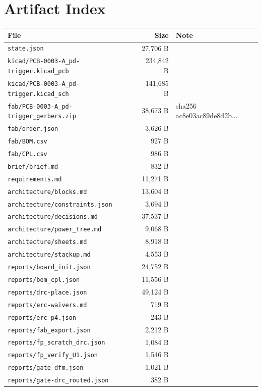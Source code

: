 \documentclass[11pt,a4paper]{article}
\begin{document}
\section{Artifact Index}
{\small
\begin{longtable}{p{9cm}rp{4cm}}
\toprule
\textbf{File} & \textbf{Size} & \textbf{Note} \\
\midrule
\endhead
\texttt{state.json} & 27,706 B &  \\
\texttt{kicad/PCB-0003-A\_pd-trigger.kicad\_pcb} & 234,842 B &  \\
\texttt{kicad/PCB-0003-A\_pd-trigger.kicad\_sch} & 141,685 B &  \\
\texttt{fab/PCB-0003-A\_pd-trigger\_gerbers.zip} & 38,673 B & sha256 ac8e03ac89de8d2b... \\
\texttt{fab/order.json} & 3,626 B &  \\
\texttt{fab/BOM.csv} & 927 B &  \\
\texttt{fab/CPL.csv} & 986 B &  \\
\texttt{brief/brief.md} & 832 B &  \\
\texttt{requirements.md} & 11,271 B &  \\
\texttt{architecture/blocks.md} & 13,604 B &  \\
\texttt{architecture/constraints.json} & 3,694 B &  \\
\texttt{architecture/decisions.md} & 37,537 B &  \\
\texttt{architecture/power\_tree.md} & 9,068 B &  \\
\texttt{architecture/sheets.md} & 8,918 B &  \\
\texttt{architecture/stackup.md} & 4,553 B &  \\
\texttt{reports/board\_init.json} & 24,752 B &  \\
\texttt{reports/bom\_cpl.json} & 11,556 B &  \\
\texttt{reports/drc-place.json} & 49,124 B &  \\
\texttt{reports/erc-waivers.md} & 719 B &  \\
\texttt{reports/erc\_p4.json} & 243 B &  \\
\texttt{reports/fab\_export.json} & 2,212 B &  \\
\texttt{reports/fp\_scratch\_drc.json} & 1,084 B &  \\
\texttt{reports/fp\_verify\_U1.json} & 1,546 B &  \\
\texttt{reports/gate-dfm.json} & 1,021 B &  \\
\texttt{reports/gate-drc\_routed.json} & 382 B &  \\

\end{longtable}}
\end{document}
